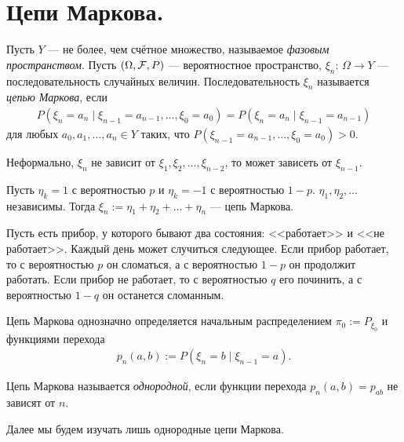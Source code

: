 \documentclass[../main.tex]{subfiles}
\begin{document}
\section{Цепи Маркова.}

\begin{df}
 Пусть $ Y $ --- не более, чем счётное множество, называемое \textit{фазовым пространством}. Пусть $ (\Omega,\mathcal F,P) $ --- вероятностное пространство, $ \xi_n \colon\, \Omega \to Y $ --- последовательность случайных величин. Последовательность $ \xi_n $ называется \textit{цепью Маркова}, если 
 \begin{align*}
  P(\xi_n = a_n \mid \xi_{n-1} = a_{n-1}, \ldots, \xi_0 = a_0) = P(\xi_n = a_n \mid \xi_{n-1} = a_{n-1})
 \end{align*} для любых $ a_0, a_1, \ldots, a_n \in Y $ таких, что $ P(\xi_{n-1} = a_{n-1}, \ldots, \xi_0 = a_0) > 0 $.

 Неформально, $ \xi_n $ не зависит от $ \xi_1, \xi_2, \ldots, \xi_{n-2} $, то может зависеть от $ \xi_{n-1} $.
\end{df}
\begin{exmpl}
 Пусть $ \eta_k = 1 $ с вероятностью $ p $ и $ \eta_k = -1 $  с вероятностью $ 1-p $. $ \eta_1, \eta_2, \ldots $  независимы. Тогда $ \xi_n := \eta_1 + \eta_2 + \ldots + \eta_n $ --- цепь Маркова.
\end{exmpl}
\begin{exmpl}
 Пусть есть прибор, у которого бывают два состояния: <<работает>> и <<не работает>>. Каждый день может случиться следующее. Если прибор работает, то с вероятностью $ p $ он сломаться, а с вероятностью $ 1-p $ он продолжит работать. Если прибор не работает, то с вероятностью $ q $ его починить, а с вероятностью $ 1-q $ он останется сломанным.
\end{exmpl}
\begin{remrk}
 Цепь Маркова однозначно определяется начальным распределением $ \pi_0 := P_{\xi_0} $ и функциями перехода
 \begin{align*}
  p_n(a,b) := P(\xi_n = b \mid \xi_{n-1} = a).
 \end{align*}
\end{remrk}

\begin{df}
 Цепь Маркова называется \textit{однородной}, если функции перехода $ p_n(a,b) = p_{ab} $ не зависят от $ n $.
\end{df}

Далее мы будем изучать лишь однородные цепи Маркова.
\end{document}
